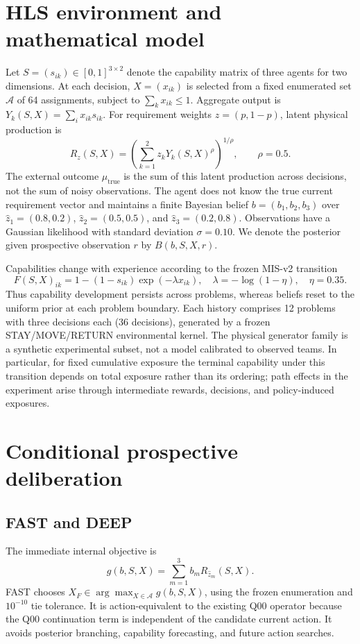 \documentclass[11pt]{article}
\begin{document}
\section{HLS environment and mathematical model}
Let $S=(s_{ik})\in[0,1]^{3\times2}$ denote the capability matrix of three agents for two dimensions. At each decision, $X=(x_{ik})$ is selected from a fixed enumerated set $\mathcal A$ of 64 assignments, subject to $\sum_k x_{ik}\leq1$. Aggregate output is $Y_k(S,X)=\sum_i x_{ik}s_{ik}$. For requirement weights $z=(p,1-p)$, latent physical production is
\begin{equation}
R_z(S,X)=\left(\sum_{k=1}^2 z_k Y_k(S,X)^\rho\right)^{1/\rho},\qquad \rho=0.5.
\end{equation}
The external outcome $\mu_{\mathrm{true}}$ is the sum of this latent production across decisions, not the sum of noisy observations. The agent does not know the true current requirement vector and maintains a finite Bayesian belief $b=(b_1,b_2,b_3)$ over $\hat z_1=(0.8,0.2)$, $\hat z_2=(0.5,0.5)$, and $\hat z_3=(0.2,0.8)$. Observations have a Gaussian likelihood with standard deviation $\sigma=0.10$. We denote the posterior given prospective observation $r$ by $B(b,S,X,r)$.

Capabilities change with experience according to the frozen MIS-v2 transition
\begin{equation}
F(S,X)_{ik}=1-(1-s_{ik})\exp(-\lambda x_{ik}),\quad
\lambda=-\log(1-\eta),\quad\eta=0.35.
\end{equation}
Thus capability development persists across problems, whereas beliefs reset to the uniform prior at each problem boundary. Each history comprises 12 problems with three decisions each (36 decisions), generated by a frozen STAY/MOVE/RETURN environmental kernel. The physical generator family is a synthetic experimental subset, not a model calibrated to observed teams. In particular, for fixed cumulative exposure the terminal capability under this transition depends on total exposure rather than its ordering; path effects in the experiment arise through intermediate rewards, decisions, and policy-induced exposures.

\section{Conditional prospective deliberation}
\subsection{FAST and DEEP}
The immediate internal objective is
\begin{equation}
g(b,S,X)=\sum_{m=1}^3 b_m R_{\hat z_m}(S,X).
\end{equation}
FAST chooses $X_F\in\arg\max_{X\in\mathcal A}g(b,S,X)$, using the frozen enumeration and $10^{-10}$ tie tolerance. It is action-equivalent to the existing Q00 operator because the Q00 continuation term is independent of the candidate current action. It avoids posterior branching, capability forecasting, and future action searches.
\end{document}
